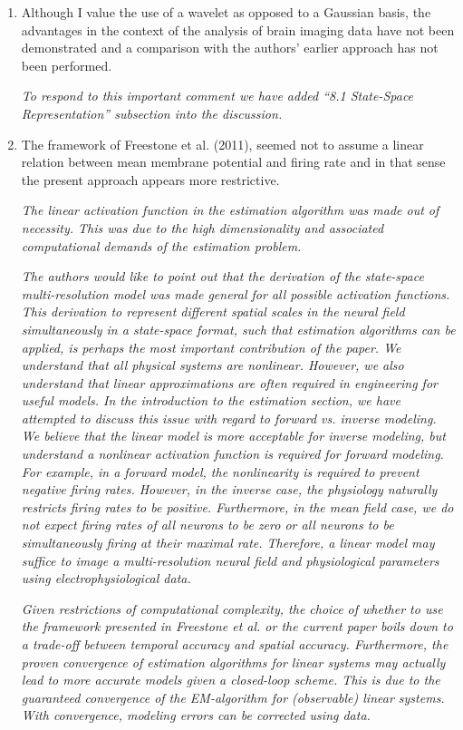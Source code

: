\documentclass{article}
\begin{document}
\begin{enumerate}
        \item Although I value the use of a wavelet as opposed to a Gaussian basis, the advantages in the context of the analysis of brain imaging data have not been demonstrated and a comparison with the authors' earlier approach has not been performed.  

\emph{To respond to this important comment we have added ``8.1 State-Space Representation'' subsection into the discussion.}

		\item{The framework of Freestone et al. (2011), seemed not to assume a linear relation between mean membrane potential and firing rate and in that sense the present approach appears more restrictive.}

\emph{The linear activation function in the estimation algorithm was made out of necessity. This was due to the high dimensionality and associated computational demands of the estimation problem.}

\emph{The authors would like to point out that the derivation of the state-space multi-resolution model was made general for all possible activation functions. This derivation to represent different spatial scales in the neural field simultaneously in a state-space format, such that estimation algorithms can be applied, is perhaps the most important contribution of the paper. We understand that all physical systems are nonlinear. However, we also understand that linear approximations are often required in engineering for useful models. In the introduction to the estimation section, we have attempted to discuss this issue with regard to forward vs. inverse modeling. We believe that the linear model is more acceptable for inverse modeling, but understand a nonlinear activation function is required for forward modeling. For example, in a forward model, the nonlinearity is required to prevent negative firing rates. However, in the inverse case, the physiology naturally restricts firing rates to be positive. Furthermore, in the mean field case, we do not expect firing rates of all neurons to be zero or all neurons to be simultaneously firing at their maximal rate. Therefore, a linear model may suffice to image a multi-resolution neural field and physiological parameters using electrophysiological data.}
				
\emph{Given restrictions of computational complexity, the choice of whether to use the framework presented in Freestone et al. or the current paper boils down to a trade-off between temporal accuracy and spatial accuracy. Furthermore, the proven convergence of estimation algorithms for linear systems may actually lead to more accurate models given a closed-loop scheme. This is due to the guaranteed convergence of the EM-algorithm for (observable) linear systems. With convergence, modeling errors can be corrected using data.}
				

\end{enumerate}
\end{document}
